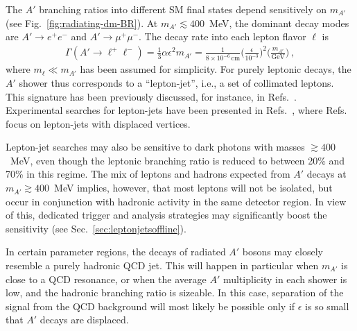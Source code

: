 The $A'$ branching ratios into different SM final states depend sensitively on $m_{A'}$ (see Fig.~\ref{fig:radiating-dm-BR}). At $m_{A'} \lesssim 400$~MeV, the dominant decay modes are $A' \to e^+e^-$ and $A' \to \mu^+ \mu^-$. The decay rate into each lepton flavor $\ell$ is
\begin{align}
  \Gamma(A' \to \ell^+\ell^-) =
    \frac{1}{3} \alpha \epsilon^2 m_{A'}
    = \frac{1}{8 \times 10^{-6}\,\text{cm}}
      \bigg( \frac{\epsilon}{10^{-3}} \bigg)^2
      \bigg( \frac{m_{A'}}{\text{GeV}} \bigg) \,,
\end{align}
where $m_\ell \ll m_{A'}$ has been assumed for simplicity. For purely leptonic decays, the $A'$ shower thus corresponds to a ``lepton-jet'', i.e., a set of collimated leptons. This signature has been previously discussed, for instance, in Refs.~\cite{ArkaniHamed:2008qp,Cheung:2009su, Katz:2009qq, Bai:2009it, Baumgart:2009tn, Chan:2011aa,Falkowski:2010gv, Curtin:2013fra, Gupta:2015lfa, Autran:2015mfa}. Experimental searches for lepton-jets have been presented in Refs.~\cite{Aad:2014yea, Aad:2015sms, ATLAS-CONF-2016-042, Khachatryan:2015wka}, where Refs.~\cite{Aad:2014yea, ATLAS-CONF-2016-042} focus on lepton-jets with displaced vertices.

Lepton-jet searches may also be sensitive to dark photons with masses $\gtrsim 400$~MeV, even though the leptonic branching ratio is reduced to between 20\% and 70\% in this regime. The mix of leptons and hadrons expected from $A'$ decays at $m_{A'} \gtrsim 400$~MeV implies, however, that most leptons will not be isolated, but occur in conjunction with hadronic activity in the same detector region. In view of this, dedicated trigger and analysis strategies may significantly boost the sensitivity (see Sec.~\ref{sec:leptonjetsoffline}).

In certain parameter regions, the decays of radiated $A'$ bosons may closely resemble a purely hadronic QCD jet. This will happen in particular when $m_{A'}$ is close to a QCD resonance, or when the average $A'$ multiplicity in each shower is low, and the hadronic branching ratio is sizeable. In this case, separation of the signal from the QCD background will most likely be possible only if $\epsilon$ is so small that $A'$ decays are displaced.

